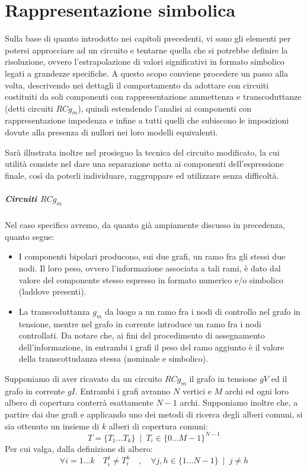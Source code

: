 \chapter{Rappresentazione simbolica}

Sulla base di quanto introdotto nei capitoli precedenti, vi sono gli elementi per potersi approcciare ad un circuito e tentarne quella che si potrebbe definire la risoluzione, ovvero l'estrapolazione di valori significativi in formato simbolico legati a grandezze specifiche. A questo scopo conviene procedere un passo alla volta, descrivendo nei dettagli il comportamento da adottare con circuiti costituiti da soli componenti con rappresentazione ammettenza e transcoduttanze (detti circuiti $RCg_m$), quindi estendendo l'analisi ai componenti con rappresentazione impedenza e infine a tutti quelli che subiscono le imposizioni dovute alla presenza di nullori nei loro modelli equivalenti.

Sarà illustrata inoltre nel prosieguo la tecnica del circuito modificato, la cui utilità consiste nel dare una separazione netta ai componenti dell'espressione finale, così da poterli individuare,  raggruppare ed utilizzare senza difficoltà.

\paragraph{Circuiti $RCg_m$}
Nel caso specifico avremo, da quanto già ampiamente discusso in precedenza, quanto segue:
\begin{itemize}
 \item I componenti bipolari producono, sui due grafi, un ramo fra gli stessi due nodi. Il loro peso, ovvero l'informazione associata a tali rami, è dato dal valore del componente stesso espresso in formato numerico e/o simbolico (laddove presenti).
 \item La transcoduttanza $g_m$ da luogo a un ramo fra i nodi di controllo nel grafo in tensione, mentre nel grafo in corrente introduce un ramo fra i nodi controllati. Da notare che, ai fini del procedimento di assegnamento dell'informazione, in entrambi i grafi il peso del ramo aggiunto è il valore della transcottudanza stessa (nominale e simbolico).
\end{itemize}
Supponiamo di aver ricavato da un circuito $RCg_m$ il grafo in tensione $gV$ ed il grafo in corrente $gI$. Entrambi i grafi avranno $N$ vertici e $M$ archi ed ogni loro albero di copertura conterrà esattamente $N-1$ archi. Supponiamo inoltre che, a partire dai due grafi e applicando uno dei metodi di ricerca degli alberi comuni, si sia ottenuto un insieme di $k$ alberi di copertura comuni:
$$ T = \{ T_1\ldots T_k \}~\mid~ T_i \in \{0\ldots M - 1\}^{N-1}$$
Per cui valga, dalla definizione di albero:
$$ \forall i = 1\ldots k\quad T_i^j \neq T_i^h\quad,\quad\forall j, h \in\{1\ldots N - 1\} ~\mid~ j \neq h $$


